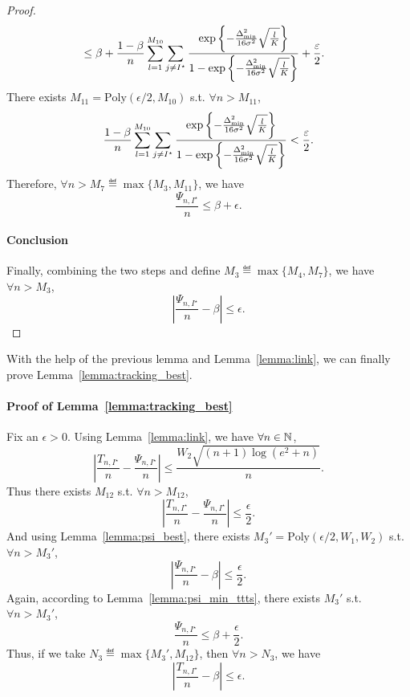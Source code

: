 \begin{proof}
\begin{align*}
                             &\leq \beta + \frac{1-\beta}{n}\sum_{l=1}^{M_{10}}\sum_{j\neq I^\star}\frac{\exp\left\{-\frac{\Delta_{\text{min}}^2}{16\sigma^2}\sqrt{\frac{l}{K}}\right\}}{1-\exp\left\{-\frac{\Delta_{\text{min}}^2}{16\sigma^2}\sqrt{\frac{l}{K}}\right\}} + \frac{\varepsilon}{2}.
    \end{align*}
    There exists $M_{11} = \text{Poly}(\epsilon/2,M_{10})$ s.t. $\forall n > M_{11}$,
    \[
        \frac{1-\beta}{n}\sum_{l=1}^{M_{10}}\sum_{j\neq I^\star}\frac{\exp\left\{-\frac{\Delta_{\text{min}}^2}{16\sigma^2}\sqrt{\frac{l}{K}}\right\}}{1-\exp\left\{-\frac{\Delta_{\text{min}}^2}{16\sigma^2}\sqrt{\frac{l}{K}}\right\}} < \frac{\varepsilon}{2}.
    \]
    Therefore, $\forall n > M_7 \eqdef \max\{M_3,M_{11}\}$, we have
    \[
        \frac{\Psi_{n,I^\star}}{n} \leq \beta + \epsilon.
    \]
    
    \paragraph{Conclusion} Finally, combining the two steps and define $M_3 \eqdef \max\{M_4,M_7\}$, we have $\forall n > M_3$,
    \[
        \left|\frac{\Psi_{n,I^\star}}{n}-\beta\right| \leq \epsilon.
    \]
\end{proof}

With the help of the previous lemma and Lemma~\ref{lemma:link}, we can finally prove Lemma~\ref{lemma:tracking_best}.

\paragraph{Proof of Lemma~\ref{lemma:tracking_best}}
Fix an $\epsilon > 0$. Using Lemma~\ref{lemma:link}, we have $\forall n\in{\mathbb N}$,
\[
    \left|\frac{T_{n,I^\star}}{n}-\frac{\Psi_{n,I^\star}}{n}\right| \leq \frac{W_2\sqrt{(n+1)\log(e^2+n)}}{n}.
\]
Thus there exists $M_{12}$ s.t. $\forall n > M_{12}$,
\[
    \left|\frac{T_{n,I^\star}}{n}-\frac{\Psi_{n,I^\star}}{n}\right| \leq \frac{\epsilon}{2}.
\]
And using Lemma~\ref{lemma:psi_best}, there exists $M_3' = \text{Poly}(\epsilon/2,W_1,W_2)$ s.t. $\forall n > M_3'$,
\[
    \left|\frac{\Psi_{n,I^\star}}{n}-\beta\right| \leq \frac{\epsilon}{2}.
\]
Again, according to Lemma~\ref{lemma:psi_min_ttts}, there exists $M_3'$ s.t. $\forall n > M_3'$,
\[
    \frac{\Psi_{n,I^\star}}{n} \leq \beta+\frac{\epsilon}{2}.
\]
Thus, if we take $N_3 \eqdef \max\{M_3',M_{12}\}$, then $\forall n > N_3$, we have
\[
    \left| \frac{T_{n,I^\star}}{n}-\beta \right| \leq \epsilon.
\]

\hfill\BlackBox\\[2mm]

